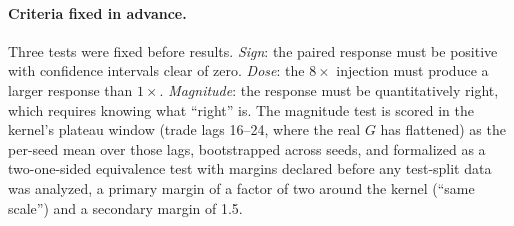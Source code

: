 \documentclass[11pt]{article}
\begin{document}
\paragraph{Criteria fixed in advance.} Three tests were fixed before results. \emph{Sign}: the paired response must be positive with confidence intervals clear of zero. \emph{Dose}: the $8\times$ injection must produce a larger response than $1\times$. \emph{Magnitude}: the response must be quantitatively right, which requires knowing what ``right'' is. The magnitude test is scored in the kernel's plateau window (trade lags 16--24, where the real $G$ has flattened) as the per-seed mean over those lags, bootstrapped across seeds, and formalized as a two-one-sided equivalence test with margins declared before any test-split data was analyzed, a primary margin of a factor of two around the kernel (``same scale'') and a secondary margin of 1.5.
\end{document}
